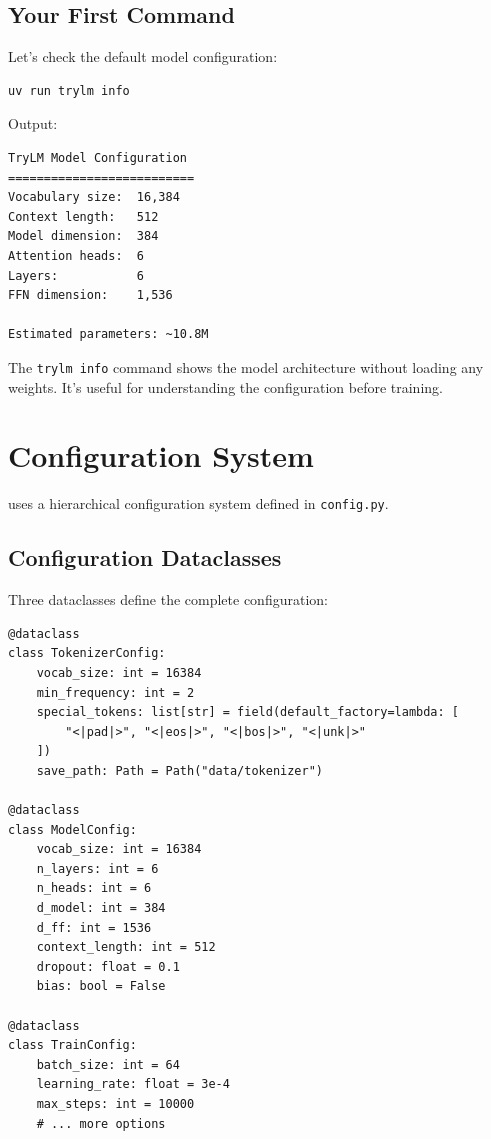 \subsection{Your First Command}

Let's check the default model configuration:

\begin{lstlisting}[style=shell]
uv run trylm info
\end{lstlisting}

Output:
\begin{lstlisting}[style=shell, numbers=none]
TryLM Model Configuration
==========================
Vocabulary size:  16,384
Context length:   512
Model dimension:  384
Attention heads:  6
Layers:           6
FFN dimension:    1,536

Estimated parameters: ~10.8M
\end{lstlisting}

\begin{keypoint}
The \texttt{trylm info} command shows the model architecture without loading any weights. It's useful for understanding the configuration before training.
\end{keypoint}

\section{Configuration System}

\TryLM uses a hierarchical configuration system defined in \texttt{config.py}.

\subsection{Configuration Dataclasses}

Three dataclasses define the complete configuration:

\begin{lstlisting}[style=python, caption={Configuration structure from config.py}]
@dataclass
class TokenizerConfig:
    vocab_size: int = 16384
    min_frequency: int = 2
    special_tokens: list[str] = field(default_factory=lambda: [
        "<|pad|>", "<|eos|>", "<|bos|>", "<|unk|>"
    ])
    save_path: Path = Path("data/tokenizer")

@dataclass
class ModelConfig:
    vocab_size: int = 16384
    n_layers: int = 6
    n_heads: int = 6
    d_model: int = 384
    d_ff: int = 1536
    context_length: int = 512
    dropout: float = 0.1
    bias: bool = False

@dataclass
class TrainConfig:
    batch_size: int = 64
    learning_rate: float = 3e-4
    max_steps: int = 10000
    # ... more options
\end{lstlisting}

